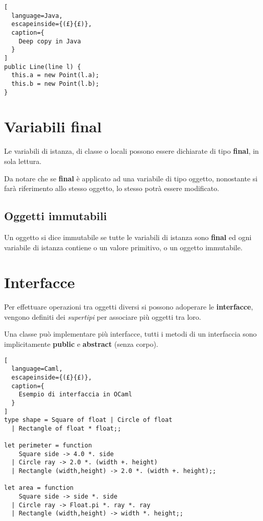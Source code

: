 \begin{lstlisting}[
  language=Java,
  escapeinside={(£}{£)},
  caption={
    Deep copy in Java
  }
]
public Line(line l) {
  this.a = new Point(l.a);
  this.b = new Point(l.b);
}
\end{lstlisting}

\section{Variabili final}
Le variabili di istanza, di classe o locali possono essere dichiarate di tipo
\textbf{final}, in sola lettura.

Da notare che se \textbf{final} è applicato ad una variabile di tipo oggetto,
nonostante si farà riferimento allo stesso oggetto, lo stesso potrà essere
modificato.

\subsection{Oggetti immutabili}
Un oggetto si dice immutabile se tutte le variabili di istanza sono \textbf{
final} ed ogni variabile di istanza contiene o un valore primitivo, o un
oggetto immutabile.

\section{Interfacce}
Per effettuare operazioni tra oggetti diversi si possono adoperare le \textbf{
interfacce}, vengono definiti dei \emph{supertipi} per associare più oggetti
tra loro.

Una classe può implementare più interfacce, tutti i metodi di un interfaccia
sono implicitamente \textbf{public} e \textbf{abstract} (senza corpo).

\begin{lstlisting}[
  language=Caml,
  escapeinside={(£}{£)},
  caption={
    Esempio di interfaccia in OCaml
  }
]
type shape = Square of float | Circle of float
  | Rectangle of float * float;;

let perimeter = function
    Square side -> 4.0 *. side
  | Circle ray -> 2.0 *. (width +. height)
  | Rectangle (width,height) -> 2.0 *. (width +. height);;

let area = function
    Square side -> side *. side
  | Circle ray -> Float.pi *. ray *. ray
  | Rectangle (width,height) -> width *. height;;
\end{lstlisting}

